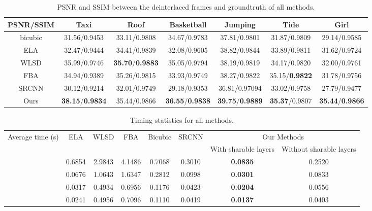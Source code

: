 \documentclass[acmtog]{acmart}
\begin{document}
\begin{table*}
	\center
	\begin{tabular}{|c|c|c|c|c|c|c|}
		\hline
		PSNR/SSIM & Taxi         & Roof & Basketball & Jumping      & Tide  &   Girl \\\hline
bicubic & 31.56/0.9453          & 33.11/0.9808      &34.67/0.9783          &37.81/0.9801    		 &31.87/0.9809                   & 29.14/0.9585  \\  \hline
		ELA     & 32.47/0.9444          & 34.41/0.9839      &32.08/0.9605             &38.82/0.9844             &33.89/0.9811                 & 31.62/0.9724  \\ \hline
		WLSD    & 35.99/0.9746          & \textbf{35.70}/\textbf{0.9883}      &35.05/0.9794    &38.19/0.9819             &34.17/0.9820                 & 32.00/0.9761 \\ \hline
		FBA     & 34.94/0.9389          & 35.26/0.9815      &33.93/0.9749             &38.27/0.9822             &35.15/\textbf{0.9822}                 & 31.78/0.9756  \\ \hline
		SRCNN   & 30.12/0.9214          & 32.01/0.9749      &29.18/0.9353             &36.81/0.97094             &33.02/0.9758                 & 27.79/0.9477  \\ \hline
		Ours    &\textbf{38.15}/\textbf{0.9834}  & 35.44/0.9866   & \textbf{36.55}/\textbf{0.9838}         &\textbf{39.75}/\textbf{0.9889}    &\textbf{35.37}/0.9807      & \textbf{35.44}/\textbf{0.9866} \\ \hline
	\end{tabular}
	\caption{PSNR and SSIM between the deinterlaced frames and groundtruth of all methods.}
	\label{tab:psnr_comparsion}
\end{table*}

\begin{table*}[!tp]
	\center
	\begin{tabular}{|c|c|c|c|c|c|c|c|}\hline
		\multirow{2}{*}{Average time (s)} & \multirow{2}{*}{ELA} &\multirow{2}{*}{WLSD} &\multirow{2}{*}{FBA} & \multirow{2}{*}{Bicubic} & \multirow{2}{*}{SRCNN} &  \multicolumn{2}{c|}{Our Methods} \\ \cline{7-8}
		& & & & & & With sharable layers & Without sharable layers\\ \hline
		 & 0.6854  &2.9843  &4.1486 &0.7068 &0.3010 & \textbf{0.0835} & 0.2520\\ \hline
		  & 0.0676  &1.0643  &1.6347 &0.2812 &0.0998 & \textbf{0.0301} & 0.0833\\ \hline
		   & 0.0317  &0.4934  &0.6956 &0.1176 &0.0423 & \textbf{0.0204} & 0.0556\\ \hline
		   & 0.0241  &0.4956  &0.7096 &0.1110 &0.0419 & \textbf{0.0137} & 0.0403\\ \hline
	\end{tabular}
	\caption{Timing statistics for all methods.}
	\label{tab:time_statistics}
\end{table*}
\end{document}

